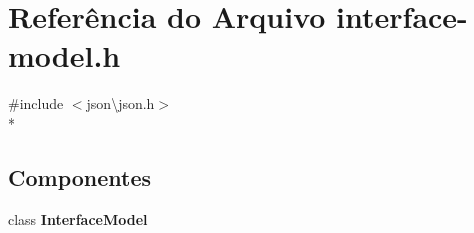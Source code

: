 \section{Referência do Arquivo interface-\/model.h}
\label{interface-model_8h}
{\ttfamily \#include $<$json\textbackslash{}json.\+h$>$}\\*
\subsection*{Componentes}
\begin{DoxyCompactItemize}
\item 
class {\bf Interface\+Model}
\end{DoxyCompactItemize}
